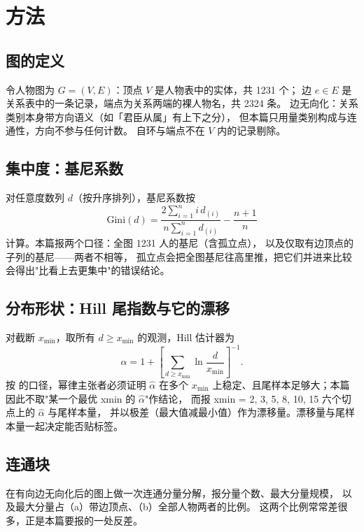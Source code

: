 \section{方法}

\subsection{图的定义}

令人物图为 $G=(V,E)$：顶点 $V$ 是人物表中的实体，共 1231 个；
边 $e\in E$ 是关系表中的一条记录，端点为关系两端的裸人物名，共 2324 条。
边无向化：关系类别本身带方向语义（如「君臣从属」有上下之分），
但本篇只用量类别构成与连通性，方向不参与任何计数。
自环与端点不在 $V$ 内的记录剔除。

\subsection{集中度：基尼系数}

对任意度数列 $d$（按升序排列），基尼系数按
\begin{equation}\label{eq:gini}
\mathrm{Gini}(d)=\frac{2\sum_{i=1}^{n} i\,d_{(i)}}{n\sum_{i=1}^{n}d_{(i)}}-\frac{n+1}{n}
\end{equation}
计算。本篇报两个口径：全图 1231 人的基尼（含孤立点），
以及仅取有边顶点的子列的基尼——两者不相等，
孤立点会把全图基尼往高里推，把它们并进来比较会得出"比看上去更集中"的错误结论。

\subsection{分布形状：Hill 尾指数与它的漂移}

对截断 $x_{\min}$，取所有 $d\ge x_{\min}$ 的观测，Hill 估计器为
\begin{equation}\label{eq:hill}
\hat\alpha = 1+\left[\sum_{d\ge x_{\min}}\ln\frac{d}{x_{\min}}\right]^{-1}.
\end{equation}
按 \citet{clauset2009} 的口径，幂律主张者必须证明 $\hat\alpha$ 在多个 $x_{\min}$
上稳定、且尾样本足够大；本篇因此不取"某一个最优 xmin 的 $\hat\alpha$"作结论，
而报 xmin = 2, 3, 5, 8, 10, 15 六个切点上的 $\hat\alpha$ 与尾样本量，
并以极差（最大值减最小值）作为漂移量。漂移量与尾样本量一起决定能否贴标签。

\subsection{连通块}

在有向边无向化后的图上做一次连通分量分解，报分量个数、最大分量规模，
以及最大分量占（a）带边顶点、（b）全部人物两者的比例。
这两个比例常常差很多，正是本篇要报的一处反差。

